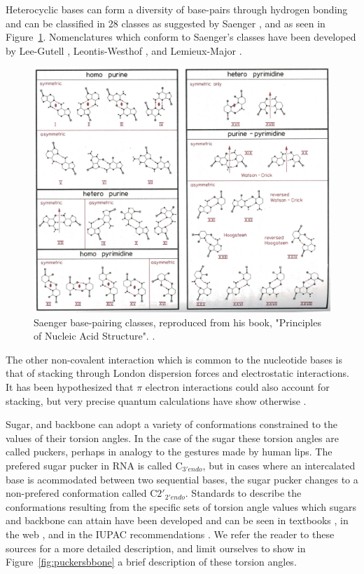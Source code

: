 Heterocyclic bases can form a diversity of base-pairs through hydrogen
bonding and  can be classified in  28 classes as  suggested by Saenger
\cite{saenger1984},   and  as   seen   in  Figure~\ref{fig:saenger28}.
Nomenclatures which  conform to Saenger's classes  have been developed
by Lee-Gutell \cite{lee2004}, Leontis-Westhof \cite{leontis2002b}, and
Lemieux-Major \cite{lemieux2002}.

\begin{figure}
\centering
\includegraphics[scale=4.0, angle=90]{Chapter1/saenger28b.png}
\caption{Saenger  base-pairing  classes,  reproduced  from  his  book,
  "Principles of Nucleic Acid Structure". \cite{saenger1984}.}
\label{fig:saenger28}
\end{figure}  

The other  non-covalent interaction which is common  to the nucleotide
bases  is  that  of  stacking  through London  dispersion  forces  and
electrostatic  interactions.   It  has  been hypothesized  that  $\pi$
electron  interactions  could  also  account for  stacking,  but  very
precise  quantum calculations  have  show otherwise  \cite{sponer1996,
  sponer1997}.

Sugar, and  backbone can adopt a variety  of conformations constrained
to the values of their torsion  angles. In the case of the sugar these
torsion angles are called puckers,  perhaps in analogy to the gestures
made  by  human  lips. The prefered sugar pucker in RNA is called
C$_{3'endo}$, but in cases where an intercalated base is acommodated
between two sequential bases, the sugar pucker changes to a
non-prefered conformation called C$2'_{2'endo}$.  Standards  to  describe the  conformations
resulting from the specific sets  of torsion angle values which sugars
and  backbone  can attain  have  been developed  and  can  be seen  in
textbooks  \cite{saenger1984}, in  the web  \cite{jenaurl}, and  in the
IUPAC recommendations  \cite{iupac1983}. We refer the  reader to these
sources for a  more detailed description, and limit  ourselves to show
in Figure~\ref{fig:puckersbbone} a  brief description of these torsion
angles.



